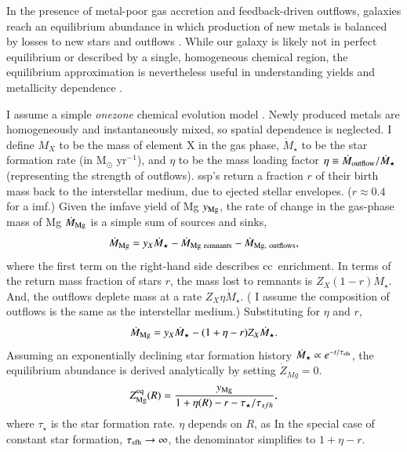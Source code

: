 \documentclass[12pt,oneside,letterpaper]{report}
\newcommand{\cc}{\gls{cc}}
\newcommand{\ssp}{\gls{ssp}}
\newcommand{\imf}{\gls{imf}}
\begin{document}
In the presence of metal-poor gas accretion and feedback-driven outflows, galaxies reach an equilibrium abundance in which production of new metals is balanced by losses to new stars and outflows \citep{larson72, dalcanton07, FD08, PS11, lilly13}.
While our galaxy is likely not in perfect equilibrium or described by a single, homogeneous chemical region, the equilibrium approximation is nevertheless useful in understanding yields and metallicity dependence \citep[e.g.][]{james_dwarf,james+23,WAF17}. 

I assume a simple \textit{\gls{onezone}} chemical evolution model \cite[e.g.][]{tinsley80, pagel09, matteucci21}.  Newly produced metals are homogeneously and instantaneously mixed, so spatial dependence is neglected.
I define $M_{X}$ to be the mass of element X in the gas phase, $\dot{M}_\star$ to be the star formation rate (in M$_\odot$ yr$^{-1}$), and $\eta$ to be the mass loading factor $\eta\equiv\dot{M}_{\rm outflow}/\dot{M}_\star$ (representing the strength of outflows). \ssp's return a fraction $r$ of their birth mass back to the interstellar medium, due to ejected stellar envelopes. ($r\approx0.4$ for a \citealt{kroupa01} \imf.)
Given the \gls{imfave} yield of Mg $y_{\rm Mg}$, the rate of change in the gas-phase mass of Mg $\dot{M}_{\rm Mg}$ is a simple sum of sources and sinks,
\begin{equation}
    \dot{M}_{\rm Mg} =  y_{X}\dot{M}_\star - \dot{M}_{\rm Mg~remnants} - \dot{M}_{\rm Mg,~outflows},
\end{equation}
where the first term on the right-hand side describes \cc\ enrichment. 
In terms of the return mass fraction of stars $r$, the mass lost to remnants is $Z_X (1-r)\dot{M}_\star$.  And, the outflows deplete mass at a rate $Z_X \eta\dot{M}_\star$. ( I assume the composition of outflows is the same as the interstellar medium.) Substituting for $\eta$ and $r$,  
\begin{equation}
    \dot{M}_{\rm Mg}= y_{X} \dot{M}_\star - (1 + \eta - r) Z_{X} \dot{M}_\star.
\end{equation}
Assuming an exponentially declining star formation history $\dot{M}_\star \propto e^{-t/\tau_{\rm sfh}}$, the equilibrium abundance is derived analytically by setting $\dot{Z}_{Mg}=0$.
\begin{equation}\label{eq:z_eq}
    Z_{\rm Mg}^{\rm eq}(R) = \frac{y_{\rm Mg}}{1 + \eta(R) - r - \tau_\star / \tau_{sfh}},
\end{equation}
where $\tau_{\star}$ is the star formation rate. $\eta$ depends on $R$, as 
In the special case of constant star formation, $\tau_{\rm sfh}\to\infty$, the denominator simplifies to $1+\eta-r$.
\end{document}
